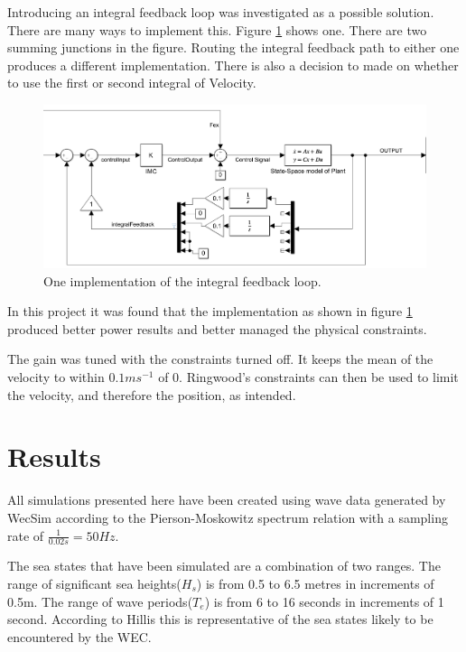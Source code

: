 \documentclass{report}
\begin{document}
Introducing an integral feedback loop was investigated as a possible solution. There are many ways to implement this. Figure \ref{integralFeedbackLoop} shows one. There are two summing junctions in the figure. Routing the integral feedback path to either one produces a different implementation. There is also a decision to made on whether to use the first or second integral of Velocity. 

\begin{figure}
\centering
\includegraphics[scale=0.5]{graphics/integralFeedback}
\caption{One implementation of the integral feedback loop.}
\label{integralFeedbackLoop}
\end{figure}

In this project it was found that the implementation as shown in figure \ref{integralFeedbackLoop} produced better power results and better managed the physical constraints.

The gain was tuned with the constraints turned off. It keeps the mean of the velocity to within $0.1ms^{-1}$ of 0. Ringwood's constraints can then be used to limit the velocity, and therefore the position, as intended.

\chapter{Results}
\label{results}

All simulations presented here have been created using wave data generated by WecSim according to the Pierson-Moskowitz spectrum relation \cite{OGPM} with a sampling rate of $\frac{1}{0.02s}=50Hz$.

The sea states that have been simulated are a combination of two ranges. The range of significant sea heights($H_s$) is from 0.5 to 6.5 metres in increments of 0.5m. The range of wave periods($T_e$) is from 6 to 16 seconds in increments of 1 second. According to Hillis \cite{andyMPC} this is representative of the sea states likely to be encountered by the WEC.
\end{document}
